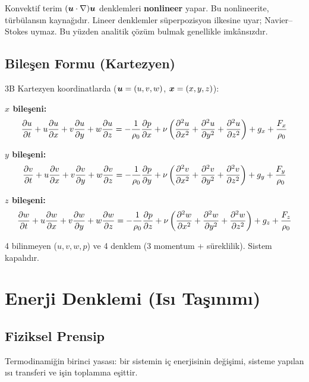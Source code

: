 \begin{remark}
Konvektif terim $(\bm{u}\cdot\nabla)\bm{u}$ denklemleri \textbf{nonlineer} yapar. Bu nonlineerite, türbülansın kaynağıdır. Lineer denklemler süperpozisyon ilkesine uyar; Navier--Stokes uymaz. Bu yüzden analitik çözüm bulmak genellikle imkânsızdır.
\end{remark}

\subsection{Bileşen Formu (Kartezyen)}

3B Kartezyen koordinatlarda ($\bm{u} = (u,v,w)$, $\bm{x} = (x,y,z)$):

\textbf{$x$ bileşeni:}
\begin{equation}
    \frac{\partial u}{\partial t} + u\frac{\partial u}{\partial x} + v\frac{\partial u}{\partial y} + w\frac{\partial u}{\partial z} = -\frac{1}{\rho_0}\frac{\partial p}{\partial x} + \nu\left(\frac{\partial^2 u}{\partial x^2} + \frac{\partial^2 u}{\partial y^2} + \frac{\partial^2 u}{\partial z^2}\right) + g_x + \frac{F_x}{\rho_0}
    \label{eq:ns_x}
\end{equation}

\textbf{$y$ bileşeni:}
\begin{equation}
    \frac{\partial v}{\partial t} + u\frac{\partial v}{\partial x} + v\frac{\partial v}{\partial y} + w\frac{\partial v}{\partial z} = -\frac{1}{\rho_0}\frac{\partial p}{\partial y} + \nu\left(\frac{\partial^2 v}{\partial x^2} + \frac{\partial^2 v}{\partial y^2} + \frac{\partial^2 v}{\partial z^2}\right) + g_y + \frac{F_y}{\rho_0}
    \label{eq:ns_y}
\end{equation}

\textbf{$z$ bileşeni:}
\begin{equation}
    \frac{\partial w}{\partial t} + u\frac{\partial w}{\partial x} + v\frac{\partial w}{\partial y} + w\frac{\partial w}{\partial z} = -\frac{1}{\rho_0}\frac{\partial p}{\partial z} + \nu\left(\frac{\partial^2 w}{\partial x^2} + \frac{\partial^2 w}{\partial y^2} + \frac{\partial^2 w}{\partial z^2}\right) + g_z + \frac{F_z}{\rho_0}
    \label{eq:ns_z}
\end{equation}

4 bilinmeyen ($u, v, w, p$) ve 4 denklem (3 momentum + süreklilik). Sistem kapalıdır.


\section{Enerji Denklemi (Isı Taşınımı)}
\label{sec:enerji}

\subsection{Fiziksel Prensip}
Termodinamiğin birinci yasası: bir sistemin iç enerjisinin değişimi, sisteme yapılan ısı transferi ve işin toplamına eşittir.

